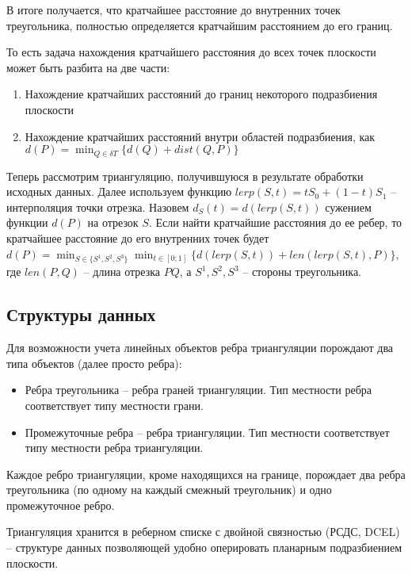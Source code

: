 
В итоге получается, что кратчайшее расстояние до внутренних точек треугольника,
полностью определяется кратчайшим расстоянием до его границ.

То есть задача нахождения кратчайшего расстояния до всех точек плоскости
может быть разбита на две части:
\begin{enumerate}
\item Нахождение кратчайших расстояний до границ некоторого подразбиения плоскости
\item Нахождение кратчайших расстояний внутри областей подразбиения, как
$d(P) = \min_{Q \in \delta T} \{d(Q) + dist(Q, P)\}$
\end{enumerate}

Теперь рассмотрим триангуляцию, получившуюся в результате обработки исходных данных.
Далее используем функцию $lerp(S, t) = tS_0 + (1-t)S_1$ -- интерполяция точки отрезка.
Назовем $d_S(t) = d(lerp(S, t))$ сужением функции $d(P)$ на отрезок $S$.
Если найти кратчайшие расстояния до ее ребер, то кратчайшее расстояние до
его внутренних точек будет
$d(P) = \min_{S \in \{S^1, S^2, S^3\} } \min_{t \in [0; 1] } \{d(lerp(S, t)) + len(lerp(S, t), P)\}$,
где $len(P, Q)$ -- длина отрезка $PQ$, а $S^1, S^2, S^3$ -- стороны треугольника.

\FloatBarrier

\subsection{Структуры данных}
Для возможности учета линейных объектов ребра триангуляции порождают
два типа объектов (далее просто ребра):
\begin{itemize}
\item Ребра треугольника -- ребра граней триангуляции.
Тип местности ребра соответствует типу местности грани.
\item Промежуточные ребра -- ребра триангуляции.
Тип местности соответствует типу местности ребра триангуляции.
\end{itemize}
Каждое ребро триангуляции, кроме находящихся на границе, порождает
два ребра треугольника (по одному на каждый смежный треугольник)
и одно промежуточное ребро.


Триангуляция хранится в реберном списке с двойной связностью
(РСДС, DCEL) -- структуре данных позволяющей удобно оперировать
планарным подразбиением плоскости.

